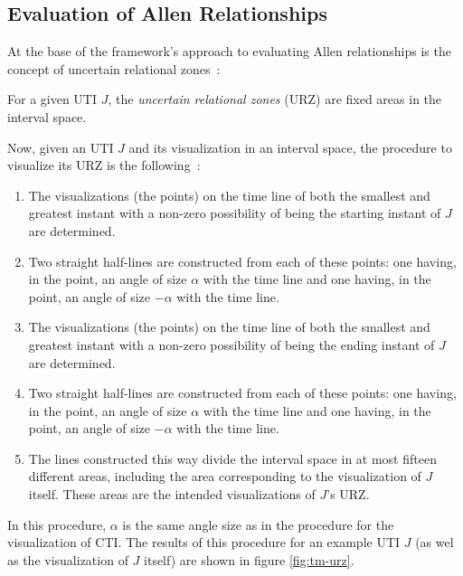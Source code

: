 \subsection{\label{subsec:tm-evaluation}Evaluation of Allen Relationships}
At the base of the framework's approach to evaluating Allen relationships is the concept of uncertain relational zones~\cite{DeTre2012}:

\begin{definition}
For a given UTI $J$, the \emph{uncertain relational zones} (URZ) are fixed areas in the interval space.
\end{definition}

Now, given an UTI $J$ and its visualization in an interval space, the procedure to visualize its URZ is the following~\cite{DeTre2012}:

\begin{enumerate}
	\item The visualizations (the points) on the time line of both the smallest and greatest instant with a non-zero possibility of being the starting instant of $J$ are determined.
	\item Two straight half-lines are constructed from each of these points: one having, in the point, an angle of size $\alpha$ with the time line and one having, in the point, an angle of size $-\alpha$ with the time line.
	\item The visualizations (the points) on the time line of both the smallest and greatest instant with a non-zero possibility of being the ending instant of $J$ are determined.
	\item Two straight half-lines are constructed from each of these points: one having, in the point, an angle of size $\alpha$ with the time line and one having, in the point, an angle of size $-\alpha$ with the time line.
	\item The lines constructed this way divide the interval space in at most fifteen different areas, including the area corresponding to the visualization of $J$ itself. These areas are the intended visualizations of $J$'s URZ.
\end{enumerate}

In this procedure, $\alpha$ is the same angle size as in the procedure for the visualization of CTI. The results of this procedure for an example UTI $J$ (as wel as the visualization of $J$ itself) are shown in figure \ref{fig:tm-urz}. 

